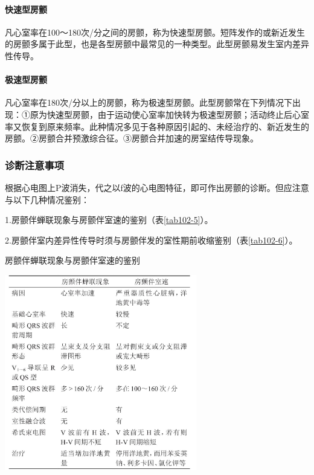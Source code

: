 \paragraph{快速型房颤}

凡心室率在100～180次/分之间的房颤，称为快速型房颤。短阵发作的或新近发生的房颤多属于此型，也是各型房颤中最常见的一种类型。此型房颤易发生室内差异性传导。

\paragraph{极速型房颤}

凡心室率在180次/分以上的房颤，称为极速型房颤。此型房颤常在下列情况下出现：①原为快速型房颤，由于运动使心室率加快转为极速型房颤；活动终止后心室率又恢复到原来频率。此种情况多见于各种原因引起的、未经治疗的、新近发生的房颤。②房颤合并预激综合征。③房颤合并加速的房室结传导现象。

\subsubsection{诊断注意事项}

根据心电图上P波消失，代之以f波的心电图特征，即可作出房颤的诊断。但应注意与以下几种情况鉴别：

1.房颤伴蝉联现象与房颤伴室速的鉴别（表\ref{tab102-5}）。

2.房颤伴室内差异性传导时须与房颤伴发的室性期前收缩鉴别（表\ref{tab102-6}）。

\begin{table}[htbp]
\centering
\caption{房颤伴蝉联现象与房颤伴室速的鉴别}
\label{tab102-5}
\includegraphics[width=3.30208in,height=3.36458in]{./images/Image00426.jpg}
\end{table}

